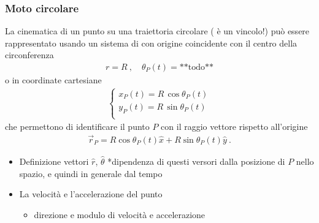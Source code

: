 \documentclass[letterpaper,10pt,italian]{jupyterBook}
\begin{document}
\subsubsection{Moto circolare}
\label{\detokenize{ch/mechanics/kinematics-point:moto-circolare}}
\sphinxAtStartPar
La cinematica di un punto su una traiettoria circolare ( è un vincolo!) può essere rappresentato usando un sistema di  con origine coincidente con il centro della circonferenza
\begin{equation*}
\begin{split}r = R \ , \quad \theta_P(t)=\text{**todo**}\end{split}
\end{equation*}
\sphinxAtStartPar
o in coordinate cartesiane
\begin{equation*}
\begin{split}\begin{cases}
 x_P(t) = R \, \cos \theta_P(t) \\
 y_P(t) = R \, \sin \theta_P(t) \\
\end{cases}\end{split}
\end{equation*}
\sphinxAtStartPar
che permettono di identificare il punto \(P\) con il raggio vettore rispetto all’origine
\begin{equation*}
\begin{split}\vec{r}_P = R \cos \theta_P(t) \hat{x} + R \sin \theta_P(t) \hat{y} \ .\end{split}
\end{equation*}\begin{itemize}
\item {} 
\sphinxAtStartPar
Definizione vettori \(\hat{r}\), \(\hat{\theta}\)  *dipendenza di questi versori dalla posizione di \(P\) nello spazio, e quindi in generale dal tempo

\item {} 
\sphinxAtStartPar
La velocità e l’accelerazione del punto 
\begin{itemize}
\item {} 
\sphinxAtStartPar
direzione e modulo di velocità e accelerazione

\end{itemize}

\end{itemize}
\end{document}
